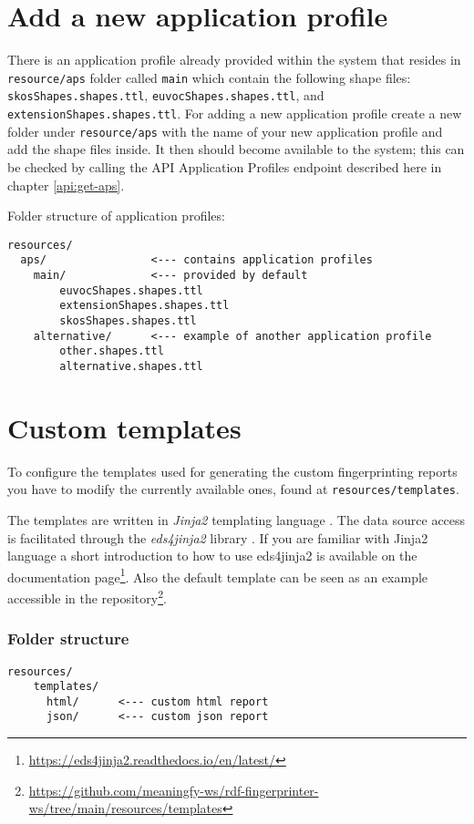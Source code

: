\section{Add a new application profile}

There is an application profile already provided within the system that resides in \texttt{resource\slash aps} folder called \texttt{main} which contain the following shape files: \texttt{skosShapes.shapes.ttl}, \texttt{euvocShapes.shapes.ttl}, and \texttt{extensionShapes.shapes.ttl}. For adding a new application profile create a new folder under \texttt{resource\slash aps} with the name of your new application profile and add the shape files inside. It then should become available to the system; this can be checked by calling the API Application Profiles endpoint described here in chapter \ref{api:get-aps}.

Folder structure of application profiles:

\begin{lstlisting}
resources/
  aps/                <--- contains application profiles
    main/             <--- provided by default
        euvocShapes.shapes.ttl
        extensionShapes.shapes.ttl
        skosShapes.shapes.ttl
    alternative/      <--- example of another application profile
        other.shapes.ttl
        alternative.shapes.ttl
\end{lstlisting}


\section{Custom templates}

To configure the templates used for generating the custom fingerprinting reports you have to modify the currently available ones, found at \texttt{resources\slash templates}. 

The templates are written in \textit{Jinja2} templating language \citep{jinja2}. The data source access is facilitated through the \textit{eds4jinja2} library \citep{eds4jinja2}. If you are familiar with Jinja2 language a short introduction to how to use eds4jinja2 is available on the documentation page\footnote{\url{https://eds4jinja2.readthedocs.io/en/latest/}}. Also the default template can be seen as an example accessible in the repository\footnote{\url{https://github.com/meaningfy-ws/rdf-fingerprinter-ws/tree/main/resources/templates}}.

\subsubsection{Folder structure}
\begin{lstlisting}
resources/
    templates/          
      html/      <--- custom html report
      json/      <--- custom json report
\end{lstlisting}

